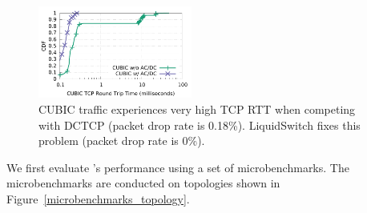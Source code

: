 \begin{figure}[th]
        \centering
  \includegraphics[width=0.45\textwidth]{figures/micro2flows/coexitence/sockperf_and_droprate/coexistence_sockperf.pdf}
        \caption{
		CUBIC traffic experiences very high TCP RTT when competing with DCTCP (packet drop rate is 0.18\%). 
		LiquidSwitch fixes this problem (packet drop rate is 0\%).
		}
        \label{coexistence_sockperf_droprate}
\end{figure}

We first evaluate \acdc{}'s performance using a set of microbenchmarks.
The microbenchmarks are conducted on topologies shown in Figure~\ref{microbenchmarks_topology}.

